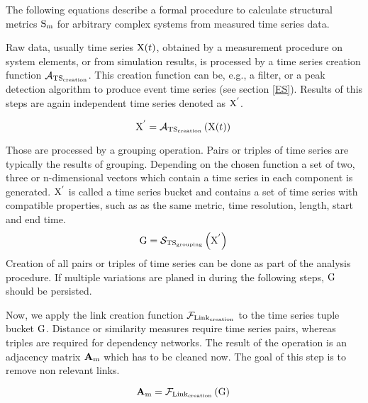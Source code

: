 \documentclass[a4paper,10pt]{scrbook}
\begin{document}
\label{ext.fig.LayerCompare} 


The following equations describe a formal procedure to calculate structural metrics ${\rm S_{m}}$ for arbitrary complex systems from measured time series data. 

Raw data, usually time series ${\rm X}(t)$, obtained by a measurement procedure on system elements, or from simulation results, is processed by a time series creation function $ \mathcal{A_{\rm {TS}_{\rm {creation}}}}$. This creation function can be, e.g., a filter, or a peak detection algorithm to produce event time series (see section \ref{ES}). Results of this steps are again independent time series denoted as ${\rm X}^{'}$.

\begin{equation}
{\rm X}^{'} = \mathcal{A}_{\rm {TS}_{\rm {creation}}}\left( {\rm X}(t) \right)\\ 
\label{eq.TSCreation}
\end{equation}

Those are processed by a grouping operation. Pairs or triples of time series are typically the results of grouping. Depending on the chosen function a set of two, three or n-dimensional vectors which contain a time series in each component is generated.
${\rm X}^{'}$ is called a time series bucket and contains a set of time series with compatible properties, such as as the same metric, time resolution, length, start and end time. 
\begin{equation}
{\rm G} = \mathcal{S}_{\rm {TS}_{\rm {grouping}}}\left( {\rm X}^{'} \right)  \\ 
\label{eq.GROUP}
\end{equation}
Creation of all pairs or triples of time series can be done as part of the analysis procedure. If multiple variations are planed in during the following steps, ${\rm G}$ should be persisted. 

Now, we apply the link creation function $\mathcal{F}_{\rm {Link}_{\rm {creation}}}$ to the time series tuple bucket ${\rm G}$. Distance or similarity measures require time series pairs, whereas triples are required for dependency networks. The result of the operation is an adjacency matrix ${\rm \textbf{A}_m}$ which has to be cleaned now. The goal of this step is to remove non relevant links.

\begin{equation}
{\rm \textbf{A}_m} = \mathcal{F}_{\rm {Link}_{\rm {creation}}} \left( {\rm G}  \right) \\ 
\label{eq.LINKMATRIX}
\end{equation}
\end{document}
